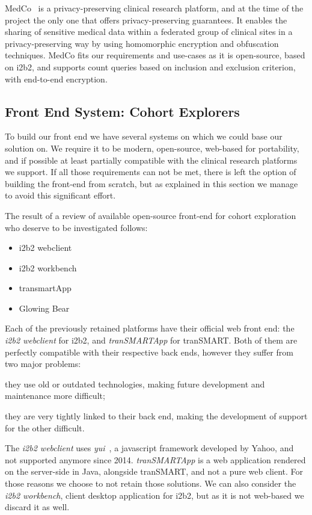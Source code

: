 MedCo~\cite{medco} is a privacy-preserving clinical research platform, and at the time of the project the only one that offers privacy-preserving guarantees.
It enables the sharing of sensitive medical data within a federated group of clinical sites in a privacy-preserving way by using homomorphic encryption and obfuscation techniques.
MedCo fits our requirements and use-cases as it is open-source, based on i2b2, and supports count queries based on inclusion and exclusion criterion, with end-to-end encryption.


\subsection{Front End System: Cohort Explorers}

To build our front end we have several systems on which we could base our solution on.
We require it to be modern, open-source, web-based for portability, and if possible at least partially compatible with the clinical research platforms we support.
If all those requirements can not be met, there is left the option of building the front-end from scratch, but as explained in this section we manage to avoid this significant effort.

The result of a review of available open-source front-end for cohort exploration who deserve to be investigated follows:
\begin{itemize}
    \item i2b2 webclient~\cite{murphy2010serving}~\cite{github:i2b2-webclient}
    \item i2b2 workbench~\cite{murphy2010serving}~\cite{github:i2b2-workbench}
    \item transmartApp~\cite{scheufele2014transmart}~\cite{github:transmartapp}
    \item Glowing Bear~\cite{gb}~\cite{github:gb}
\end{itemize}

Each of the previously retained platforms have their official web front end: the \emph{i2b2 webclient} for i2b2, and \emph{tranSMARTApp} for tranSMART.
Both of them are perfectly compatible with their respective back ends, however they suffer from two major problems:
\begin{enumerate*}
    \item they use old or outdated technologies, making future development and maintenance more difficult;
    \item they are very tightly linked to their back end, making the development of support for the other difficult.
\end{enumerate*}
The \emph{i2b2 webclient} uses \emph{yui}~\cite{yui}, a javascript framework developed by Yahoo, and not supported anymore since 2014. 
\emph{tranSMARTApp} is a web application rendered on the server-side in Java, alongside tranSMART, and not a pure web client.
For those reasons we choose to not retain those solutions.
We can also consider the \emph{i2b2 workbench}, client desktop application for i2b2, but as it is not web-based we discard it as well.

